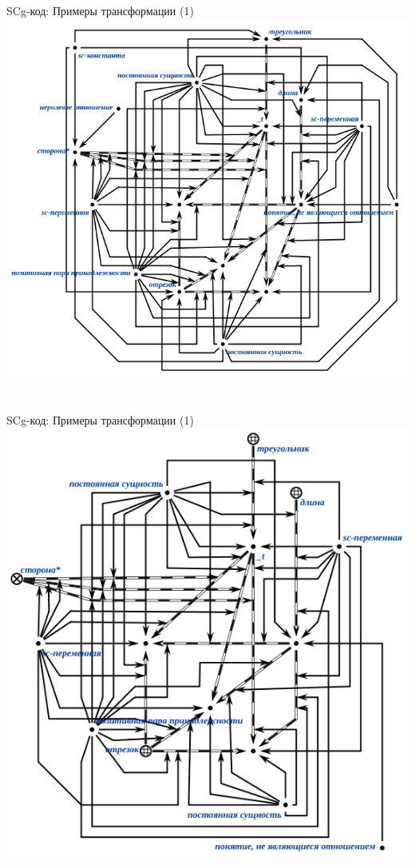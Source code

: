 \begin{frame}{\\SCg-код: Примеры трансформации (1)}
	\topline
	\justifying
	\vspace*{\fill}\\
	\vspace{10mm}
	\centering
	\includegraphics[scale=0.5]{./figures/intro/scg/examples/scg_examples_transf_1_1.png}
\end{frame}

\begin{frame}{\\SCg-код: Примеры трансформации (1)}
	\topline
	\justifying
	\vspace*{\fill}\\
	\vspace{10mm}
	\centering
	\includegraphics[scale=0.5]{./figures/intro/scg/examples/scg_examples_transf_1_2.png}
\end{frame}

